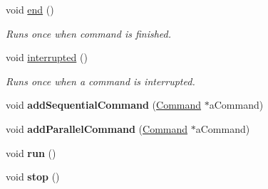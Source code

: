 \begin{DoxyCompactItemize}
void \mbox{\hyperlink{classlib_iterative_robot_1_1_command_group_a28ad3a1c2f6b4f9aea10efa1a824895e}{end}} ()
\begin{DoxyCompactList}\small\item\em Runs once when command is finished. \end{DoxyCompactList}\item 
\mbox{\label{classlib_iterative_robot_1_1_command_group_a5174a8e63675bead12b84e39df0ae90e}} 
void \mbox{\hyperlink{classlib_iterative_robot_1_1_command_group_a5174a8e63675bead12b84e39df0ae90e}{interrupted}} ()
\begin{DoxyCompactList}\small\item\em Runs once when a command is interrupted. \end{DoxyCompactList}\item 
\mbox{\label{classlib_iterative_robot_1_1_command_group_ae6cdd735460cf917243bdbfe451b651a}} 
void {\bfseries add\+Sequential\+Command} (\mbox{\hyperlink{classlib_iterative_robot_1_1_command}{Command}} $\ast$a\+Command)
\item 
\mbox{\label{classlib_iterative_robot_1_1_command_group_a339c87cb07c043b8f4fe6b29b4c46171}} 
void {\bfseries add\+Parallel\+Command} (\mbox{\hyperlink{classlib_iterative_robot_1_1_command}{Command}} $\ast$a\+Command)
\item 
\mbox{\label{classlib_iterative_robot_1_1_command_group_a9e76c6d0ef039eca4dc27dd2f0144485}} 
void {\bfseries run} ()
\item 
\mbox{\label{classlib_iterative_robot_1_1_command_group_ad521849c9a7f1b3f952b318ee424c5b9}} 
void {\bfseries stop} ()
\end{DoxyCompactItemize}

